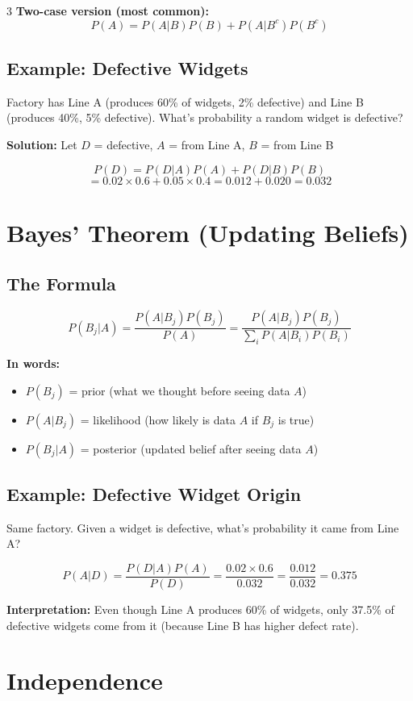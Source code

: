 \documentclass[10pt,landscape]{article}
\begin{document}
\begin{multicols}{3}
\textbf{Two-case version (most common):}
$$P(A) = P(A|B)P(B) + P(A|B^c)P(B^c)$$

\subsection{Example: Defective Widgets}
Factory has Line A (produces 60\% of widgets, 2\% defective) and Line B (produces 40\%, 5\% defective). What's probability a random widget is defective?

\textbf{Solution:} Let $D$ = defective, $A$ = from Line A, $B$ = from Line B

$$P(D) = P(D|A)P(A) + P(D|B)P(B)$$
$$= 0.02 \times 0.6 + 0.05 \times 0.4 = 0.012 + 0.020 = 0.032$$

\section{Bayes' Theorem (Updating Beliefs)}

\subsection{The Formula}
$$P(B_j|A) = \frac{P(A|B_j)P(B_j)}{P(A)} = \frac{P(A|B_j)P(B_j)}{\sum_i P(A|B_i)P(B_i)}$$

\textbf{In words:}
\begin{itemize}[leftmargin=*,noitemsep,topsep=0pt]
\item $P(B_j)$ = prior (what we thought before seeing data $A$)
\item $P(A|B_j)$ = likelihood (how likely is data $A$ if $B_j$ is true)
\item $P(B_j|A)$ = posterior (updated belief after seeing data $A$)
\end{itemize}

\subsection{Example: Defective Widget Origin}
Same factory. Given a widget is defective, what's probability it came from Line A?

$$P(A|D) = \frac{P(D|A)P(A)}{P(D)} = \frac{0.02 \times 0.6}{0.032} = \frac{0.012}{0.032} = 0.375$$

\textbf{Interpretation:} Even though Line A produces 60\% of widgets, only 37.5\% of defective widgets come from it (because Line B has higher defect rate).

\section{Independence}


\end{multicols}
\end{document}

